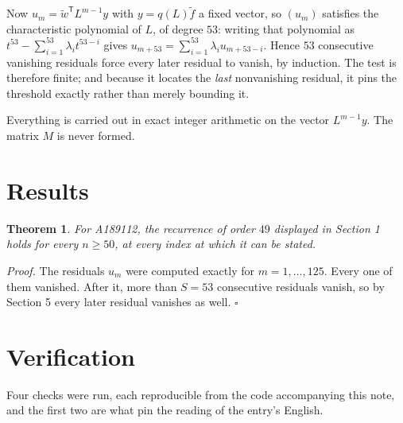 \documentclass[11pt]{article}
\newtheorem{theorem}{Theorem}
\theoremstyle{definition}
\begin{document}
Now $u_m = \tilde w^{\mathsf T} L^{m-1} y$ with $y = q(L)\tilde f$ a fixed vector, so $(u_m)$ satisfies the characteristic polynomial of $L$, of degree $53$: writing that polynomial as $t^{53} - \sum_{i=1}^{53} \lambda_i t^{53-i}$ gives $u_{m+53} = \sum_{i=1}^{53} \lambda_i u_{m+53-i}$. Hence $53$ consecutive vanishing residuals force every later residual to vanish, by induction. The test is therefore finite; and because it locates the {\itshape last} nonvanishing residual, it pins the threshold exactly rather than merely bounding it.

Everything is carried out in exact integer arithmetic on the vector $L^{m-1}y$. The matrix $M$ is never formed.

\section{Results}

\begin{theorem} For A189112, the recurrence of order $49$ displayed in Section 1 holds for every $n \ge 50$, at every index at which it can be stated.\end{theorem}

{\itshape Proof.} The residuals $u_m$ were computed exactly for $m = 1,\dots,125$. Every one of them vanished. After it, more than $S = 53$ consecutive residuals vanish, so by Section 5 every later residual vanishes as well. $\square$

\section{Verification}

Four checks were run, each reproducible from the code accompanying this note, and the first two are what pin the reading of the entry's English.
\end{document}
